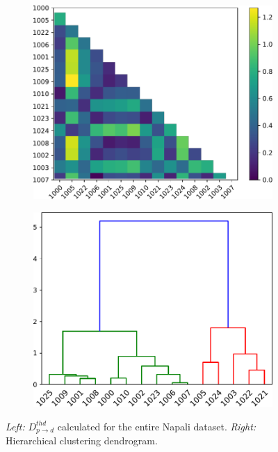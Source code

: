 \begin{figure}[ht!]
    \centering
    \begin{subfigure}{0.45\textwidth}
        \centering
        \includegraphics[width=1\linewidth]{img/napali_eval/subthreshold/clustering/distance_thd.pdf}
        \caption{}
        \label{fig:expdes:sub:cluster_thd:di}
    \end{subfigure} \hspace{5mm}
    \begin{subfigure}{0.45\textwidth}
        \centering
        \includegraphics[width=1\linewidth]{img/napali_eval/subthreshold/clustering/dendrogram_thd.pdf}
        \caption{}
        \label{fig:expdes:sub:cluster_thd:de}
    \end{subfigure}
    \caption{
    \textit{Left:} $D_{p \rightarrow d}^{thd}$ calculated for the entire Napali dataset.
    \textit{Right:} Hierarchical clustering dendrogram.
    }
    \label{fig:expdes:sub:cluster_thd}
\end{figure}

